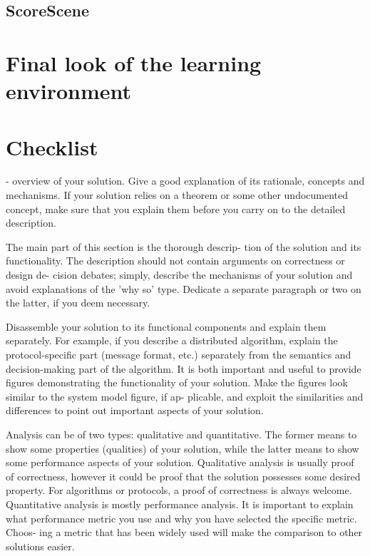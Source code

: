 \subsection{ScoreScene}


\section{Final look of the learning environment}


\section{Checklist}

- overview of your solution. Give a good explanation of its rationale,
concepts and mechanisms. If your solution relies on a
theorem or some other undocumented concept, make sure
that you explain them before you carry on to the detailed
description.

The main part of this section is the thorough descrip-
tion of the solution and its functionality.
The description should not contain arguments on correctness or design de-
cision debates; simply, describe the mechanisms of your
solution and avoid explanations of the 'why so' type.
Dedicate a separate paragraph or two on the latter, if
you deem necessary.

Disassemble your solution to its functional components
and explain them separately. For example, if you describe
a distributed algorithm, explain the protocol-specific part
(message format, etc.) separately from the semantics and
decision-making part of the algorithm.
It is both important and useful to provide figures
demonstrating the functionality of your solution. Make
the figures look similar to the system model figure, if ap-
plicable, and exploit the similarities and differences to
point out important aspects of your solution.

Analysis can be of two types: qualitative and quantitative.
The former means to show some properties (qualities)
of your solution, while the latter means to show some
performance aspects of your solution.
Qualitative analysis is usually proof of correctness,
however it could be proof that the solution possesses some
desired property. For algorithms or protocols, a proof of
correctness is always welcome.
Quantitative analysis is mostly performance analysis.
It is important to explain what performance metric you
use and why you have selected the specific metric. Choos-
ing a metric that has been widely used will make the
comparison to other solutions easier.
